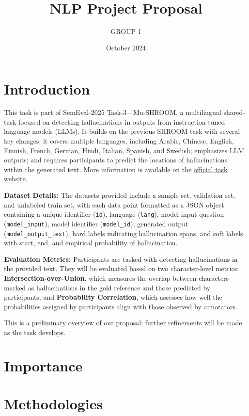 \documentclass{article}
\title{NLP Project Proposal}
\author{GROUP 1}
\date{October 2024}
\begin{document}
\maketitle

\section*{Introduction}
This task is part of SemEval-2025 Task-3—Mu-SHROOM, a multilingual shared-task focused on detecting hallucinations in outputs from instruction-tuned language models (LLMs). It builds on the previous SHROOM task with several key changes: it covers multiple languages, including Arabic, Chinese, English, Finnish, French, German, Hindi, Italian, Spanish, and Swedish; emphasizes LLM outputs; and requires participants to predict the locations of hallucinations within the generated text. More information is available on the \href{https://helsinki-nlp.github.io/shroom/}{official task website}.

\textbf{Dataset Details:} The datasets provided include a sample set, validation set, and unlabeled train set, with each data point formatted as a JSON object containing a unique identifier (\texttt{id}), language (\texttt{lang}), model input question (\texttt{model\_input}), model identifier (\texttt{model\_id}), generated output (\texttt{model\_output\_text}), hard labels indicating hallucination spans, and soft labels with start, end, and empirical probability of hallucination. 

\textbf{Evaluation Metrics:} Participants are tasked with detecting hallucinations in the provided text. They will be evaluated based on two character-level metrics: \textbf{Intersection-over-Union}, which measures the overlap between characters marked as hallucinations in the gold reference and those predicted by participants, and \textbf{Probability Correlation}, which assesses how well the probabilities assigned by participants align with those observed by annotators. 

This is a preliminary overview of our proposal; further refinements will be made as the task develops.


\section*{Importance}

\section*{Methodologies}
\end{document}
